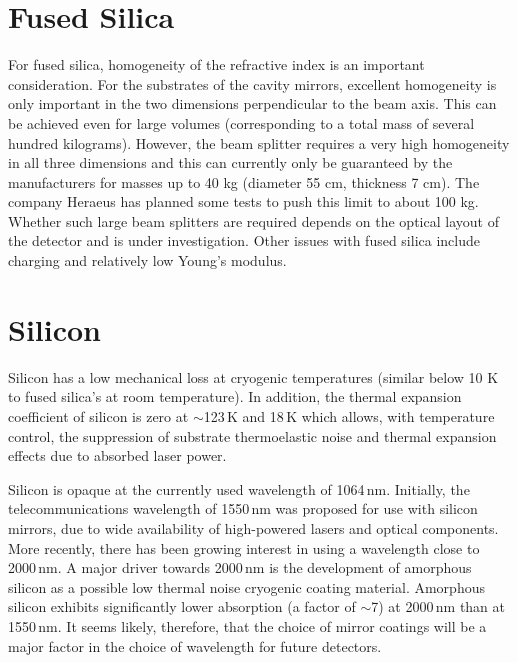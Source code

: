  

\section{Fused Silica} 
For fused silica, homogeneity of the refractive index is an important consideration. For the substrates of the cavity mirrors, excellent homogeneity is only important in the two dimensions perpendicular to the beam axis. This can be achieved even for large volumes (corresponding to a total mass of several hundred kilograms). However, the beam splitter requires a very high homogeneity in all three dimensions and this can currently only be guaranteed by the manufacturers for masses up to 40 kg (diameter 55 cm, thickness 7 cm). The company Heraeus has planned some tests to push this limit to about 100 kg. Whether such large beam splitters are required depends on the optical layout of the detector and is under investigation. Other issues with fused silica include charging and relatively low Young's modulus.

\section{Silicon}
Silicon has a low mechanical loss at cryogenic temperatures (similar below 10 K to fused silica's at room temperature).
In addition, the thermal expansion coefficient of silicon is zero at $\sim$123\,K and 18\,K which allows, with temperature control, the suppression of substrate thermoelastic noise and thermal expansion effects due to absorbed laser power.

Silicon is opaque at the currently used wavelength of 1064\,nm. Initially, the telecommunications wavelength of 1550\,nm was proposed for use with silicon mirrors, due to wide availability of high-powered lasers and optical components. More recently, there has been growing interest in using a wavelength close to 2000\,nm. A major driver towards 2000\,nm is the development of amorphous silicon as a possible low thermal noise cryogenic coating material. Amorphous silicon exhibits significantly lower absorption (a factor of $\sim$7) at 2000\,nm than at 1550\,nm. It seems likely, therefore, that the choice of mirror coatings will be a major factor in the choice of wavelength for future detectors. 

